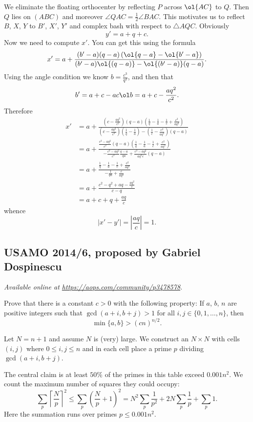 \documentclass[11pt]{scrartcl}
\begin{document}
We eliminate the floating orthocenter
by reflecting $P$ across $\ol{AC}$ to $Q$.
Then $Q$ lies on $(ABC)$ and moreover $\angle QAC = \tfrac 12 \angle BAC$.
This motivates us to reflect $B$, $X$, $Y$
to $B'$, $X'$, $Y'$ and complex bash with respect to $\triangle AQC$.
Obviously \[ y' = a + q + c. \]
Now we need to compute $x'$.
You can get this using the formula
\[ x' = a + \frac{(b'-a)(q-a)\left( \ol{q-a}-\ol{b'-a} \right)}{(b'-a)\ol{(q-a)}
  - \ol{(b'-a)}(q-a)}. \]
Using the angle condition we know
$b = \frac{c^3}{q^2}$, and then that
\[ b' = a+c - ac\ol b = a+c-\frac{aq^2}{c^2}. \]
Therefore
\begin{align*}
  x' &= a + \frac{\left( c-\frac{aq^2}{c^2} \right)\left( q-a \right)\left( \frac 1q - \frac 1a - \frac 1c + \frac{c^2}{aq^2}  \right)}{\left( c-\frac{aq^2}{c^2} \right)\left( \frac 1q - \frac 1a \right) - \left( \frac 1c - \frac{c^2}{aq^2} \right)\left( q-a \right)} \\
  &= a + \frac{\frac{c^3-aq^2}{c^2} \left( q-a \right)\left( \frac 1q - \frac 1a - \frac 1c + \frac{c^2}{aq^2} \right)}{-\frac{c^3-aq^2}{c^2}\frac{q-a}{qa} + \frac{c^3-aq^2}{aq^2c}(q-a)} \\
  &= a + \frac{\frac 1q - \frac 1a - \frac 1c + \frac{c^2}{aq^2}}{-\frac{1}{qa} + \frac{c}{aq^2}} \\
  &= a + \frac{c^2-q^2 + aq-\frac{aq^2}{c}}{c-q} \\
  &= a + c + q + \frac{aq}{c}
\end{align*}
whence
\[ \left\lvert x'-y' \right\rvert
  = \left\lvert \frac{aq}{c} \right\rvert
  = 1. \]
\pagebreak

\subsection{USAMO 2014/6, proposed by Gabriel Dospinescu}
\textsl{Available online at \url{https://aops.com/community/p3478578}.}
\begin{mdframed}[style=mdpurplebox,frametitle={Problem statement}]
Prove that there is a constant $c>0$ with the following property:
If $a$, $b$, $n$ are positive integers such that $\gcd(a+i, b+j)>1$
for all $i, j \in \{0, 1, \dots, n\}$, then
\[ \min\{a, b\}> (cn)^{n/2}. \]
\end{mdframed}
Let $N = n+1$ and assume $N$ is (very) large.
We construct an $N \times N$ with cells $(i,j)$
where $0 \le i, j \le n$ and in each cell
place a prime $p$ dividing $\gcd (a+i, b+j)$.

The central claim is at least $50\%$ of the primes
in this table exceed $0.001n^2$.
We count the maximum number of squares they could occupy:
\[
  \sum_p \left\lceil \frac{N}{p} \right\rceil^2
  \le \sum_p \left( \frac Np + 1 \right)^2
  = N^2 \sum_p \frac{1}{p^2} + 2N \sum_p \frac1p + \sum_p 1. \]
Here the summation runs over primes $p \le 0.001n^2$.
\end{document}
